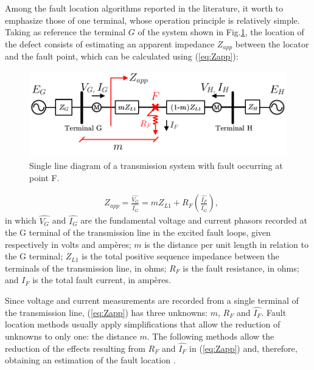 \documentclass[conference]{IEEEtran}
\begin{document}
Among the fault location algorithms reported in the literature, it worth to emphasize those of one terminal, whose operation principle is relatively simple. Taking as reference the terminal $G$ of the system shown in Fig.\ref{fig:SistLocFal}, the location of the defect consists of estimating an apparent impedance $Z_{app}$ between the locator and the fault point, which can be calculated using (\ref{eq:Zapp}):
\begin{figure}[hbt]
	\begin{center}
		\includegraphics[width=1\columnwidth]{./fig/SistLocFal.pdf}
		\caption{Single line diagram of a transmission system with fault occurring at point F.}
		\label{fig:SistLocFal}
	\end{center}
\end{figure}

\begin{equation}\label{eq:Zapp}
	\begin{aligned}
		&Z_{app}=\frac{\widehat{V_G}}{\widehat{I_G}}=mZ_{L1}+R_F\left(\frac{\widehat{I_F}}{\widehat{I_G}}\right),
	\end{aligned}
\end{equation}
in which $\widehat{V_G}$ and $\widehat{I_G}$ are the fundamental voltage and current phasors recorded at the G terminal of the transmission line in the excited fault loops, given respectively in volts and ampères; $m$ is the distance per unit length in relation to the G terminal; $Z_{L1}$ is the total positive sequence impedance between the terminals of the transmission line, in ohms; $R_F$ is the fault resistance, in ohms; and $I _F$ is the total fault current, in ampères.

Since voltage and current measurements are recorded from a single terminal of the transmission line, (\ref{eq:Zapp}) has three unknowns: $m$, $R_F$ and $\widehat{I_F}$. Fault location methods usually apply simplifications that allow the reduction of unknowns to only one: the distance $m$. The following methods allow the reduction of the effects resulting from $R_F$ and $\widehat{I_F}$ in (\ref{eq:Zapp}) and, therefore, obtaining an estimation of the fault location \cite{Das2014}.
\end{document}
